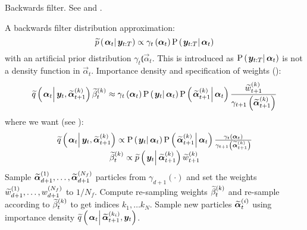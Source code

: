 \begin{algorithm}[H]
\caption{Backwards filter. See \cite{briers10} and \cite{fearnhead10}.}\label{alg:backward}
\begin{algorithmic}[1]\raggedright
\INPUT
\Statex A backwards filter distribution approximation:
\begin{equation}
	\propAproxC{\vec{\alpha}_t}{\vec{y}_{t:T}} \propto \gamma_t \Lparen{\vec{\alpha}_t}\propC{\vec{y}_{t:T}}{\vec{\alpha}_t}
\end{equation} 
\Statex with an  artificial prior distribution $\gamma_t \Lparen{\vec{\alpha}_t}$. This is introduced as $\propC{\vec{y}_{t:T}}{\vec{\alpha}_t}$ is not a density function in $\vec{\alpha}_t$.
\Statex Importance density and specification of weights {\footnotesize (\citet[page 451 -- look in the example in the appendix]{fearnhead10})}:
\Statex\begin{equation}
	\IDAproxC{\vec{\alpha}_t}{\vec{y}_t, \particB{\vec{\alpha}}{t + 1}{k}}\particB{\beta}{t}{k} \approx %
		\gamma_t\Lparen{\vec{\alpha}_t}
		\propC{\vec{y}_t}{\vec{\alpha}_t}
		\propC{\particB{\vec{\alpha}}{t + 1}{k}}{\vec{\alpha}_t}
		\frac{\particB{w}{t + 1}{k}}{\gamma_{t + 1}\Lparen{\particB{\vec{\alpha}}{t + 1}{k}}}
\end{equation}
\Statex where we want {\footnotesize (see \citet[page 74]{briers10})}:
\Statex\begin{equation}\begin{matrix}
	\IDAproxC{\vec{\alpha}_t}{\vec{y}_t, \particB{\vec{\alpha}}{t + 1}{k}} \propto %
		\propC{\vec{y}_t}{\vec{\alpha}_t}
		\propC{\particB{\vec{\alpha}}{t + 1}{k}}{\vec{\alpha}_t}
		\frac{\gamma_t\Lparen{\vec{\alpha}_t}}{\gamma_{t + 1}\Lparen{\particB{\vec{\alpha}}{t + 1}{k}}} \\
	\particB{\beta}{t}{k} \propto %
		 \propAproxC{\vec{y}_t}{\particB{\vec{\alpha}}{t + 1}{k}}\particB{w}{t + 1}{k}
\end{matrix}\end{equation}
%
\State Sample $\widetilde{\bm{\alpha}}_{d+1}^{\left( 1\right)},\dots,\widetilde{\bm{\alpha}}_{d+1}^{\left( N_f\right)}$ particles from $\gamma_{d+1}(\cdot)$ and set the weights $\widetilde{w}_{d + 1}^{\left( 1\right)},\dots,w_{d+1}^{\left( N_f\right)}$ to $1 / N_f$.
%
\State Compute re-sampling weights $\widetilde{\beta}_{t}^{\left( k\right)}$ and re-sample according to $\widetilde{\beta}_{t}^{\left( k\right)}$ to get indices $k_1,\dots k_N$.
\EndProcedure
%
\State Sample new particles $\widetilde{\bm{\alpha}}_{t}^{\left( i\right)}$ using importance density $\IDAproxC{\vec{\alpha}_t}{\particB{\vec{\alpha}}{t + 1}{k_i}, \vec{y}_t}$.

\end{algorithmic}
\end{algorithm}
